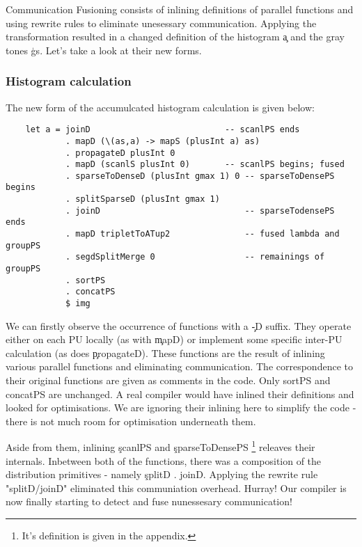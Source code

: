       Communication Fusioning consists of inlining definitions of parallel functions and using rewrite rules to eliminate
      unesessary communication. Applying the transformation resulted in a changed definition of the histogram \c{a} and the
      gray tones \c{gs}. Let's take a look at their new forms.
      
      \subsubsection{Histogram calculation}
        The new form of the accumulcated histogram calculation is given below:
        \begin{lstlisting}
    let a = joinD                           -- scanlPS ends
            . mapD (\(as,a) -> mapS (plusInt a) as)
            . propagateD plusInt 0
            . mapD (scanlS plusInt 0)       -- scanlPS begins; fused
            . sparseToDenseD (plusInt gmax 1) 0 -- sparseToDensePS begins
            . splitSparseD (plusInt gmax 1)     
            . joinD                             -- sparseTodensePS ends
            . mapD tripletToATup2               -- fused lambda and groupPS 
            . segdSplitMerge 0                  -- remainings of groupPS
            . sortPS
            . concatPS
            $ img
        \end{lstlisting}
        We can firstly observe the occurrence of functions with a \c{-D} suffix. They operate either
        on each PU locally (as with \c{mapD}) or implement some specific inter-PU calculation (as does \c{propagateD}).
        These functions are the result of inlining various parallel functions and eliminating communication.
        The correspondence to their original functions are given as comments in the code. Only sortPS and concatPS
        are unchanged. A real compiler would have inlined their definitions and looked for optimisations.
        We are ignoring their inlining here to simplify the code - there is not much room for optimisation underneath them.
        
        
        Aside from them, inlining \c{scanlPS} and \c{sparseToDensePS}
        \footnote[1]{It's definition is given in the appendix.} releaves their internals.
        Inbetween both of the functions, there was a composition of the distribution primitives - namely \c{splitD . joinD}.
        Applying the rewrite rule "splitD/joinD" eliminated this communiation overhead. Hurray! Our compiler
        is now finally starting to detect and fuse nunessesary communication!
        
